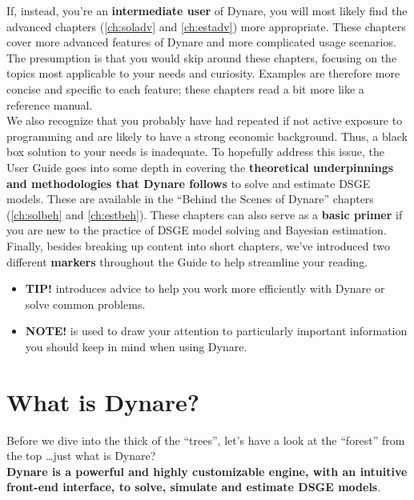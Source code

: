 If, instead, you're an \textbf{intermediate user} of Dynare, you will most likely find the advanced chapters (\ref{ch:soladv} and \ref{ch:estadv}) more appropriate. These chapters cover more advanced features of Dynare and more complicated usage scenarios. The presumption is that you would skip around these chapters, focusing on the topics most applicable to your needs and curiosity. Examples are therefore more concise and specific to each feature; these chapters read a bit more like a reference manual.\\

We also recognize that you probably have had repeated if not active exposure to programming and are likely to have a strong economic background. Thus, a black box solution to your needs is inadequate. To hopefully address this issue, the User Guide goes into some depth in covering the \textbf{theoretical underpinnings and methodologies that Dynare follows} to solve and estimate DSGE models. These are available in the ``Behind the Scenes of Dynare'' chapters (\ref{ch:solbeh} and \ref{ch:estbeh}). These chapters can also serve as a \textbf{basic primer} if you are new to the practice of DSGE model solving and Bayesian estimation. \\

Finally, besides breaking up content into short chapters, we've introduced two different \textbf{markers} throughout the Guide to help streamline your reading.
\begin{itemize}
\item \textbf{\textsf{TIP!}} introduces advice to help you work more efficiently with Dynare or solve common problems.  
\item \textbf{\textsf{NOTE!}} is used to draw your attention to particularly important information you should keep in mind when using Dynare. 
\end{itemize} 


\section{What is Dynare?}
Before we dive into the thick of the ``trees'', let's have a look at the ``forest'' from the top \ldots just what is Dynare? \\

\textbf{Dynare is a powerful and highly customizable engine, with an intuitive front-end interface, to solve, simulate and estimate DSGE models}. \\


